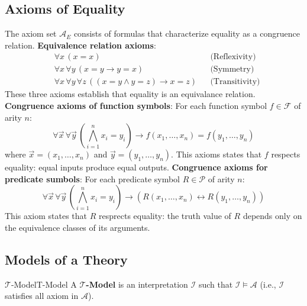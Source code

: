 \documentclass[a4paper]{article}
\theoremstyle{definition}
\begin{document}
\subsection{Axioms of Equality}
The axiom set \( \mathcal{A}_{E} \) consists of formulas that characterize equality as a congruence relation.
\vspace{1em}
\noindent
\newline
\textbf{Equivalence relation axioms}:
\begin{align*}
	& \forall x\, (x = x) && \text{(Reflexivity)} \\
	& \forall x\, \forall y\, (x = y \rightarrow y = x) && \text{(Symmetry)} \\
	& \forall x\, \forall y\, \forall z\, ((x = y \wedge y = z) \rightarrow x = z) && \text{(Transitivity)}
\end{align*}
These three axioms establish that equality is an equivalance relation.
\vspace{1em}
\noindent
\newline
\textbf{Congruence axioms of function symbols}: For each function symbol \( f \in \mathcal{F} \) of arity \( n \):
\[
	\forall \overrightarrow{x}\, \forall \overrightarrow{y}\, (\bigwedge_{i = 1}^{n} x_i = y_i) \rightarrow f(x_1, \ldots, x_n) = f(y_1, \ldots, y_n) 
\]
where \( \overrightarrow{x} = (x_1, \ldots, x_n) \) and \( \overrightarrow{y} = (y_1, \ldots, y_n) \).
\vspace{1em}
\noindent
\newline
This axioms states that \( f \) respects equality: equal inputs produce equal outputs.\vspace{1em}
\noindent
\newline
\textbf{Congruence axioms for predicate sumbols}: For each predicate symbol \( R \in \mathcal{P} \) of arity \( n \):
\[
  \forall \overrightarrow{x}\, \forall \overrightarrow{y}\, (\bigwedge_{i = 1}^{n} x_i = y_i) \rightarrow (R(x_1, \ldots, x_n) \leftrightarrow R(y_1, \ldots, y_n))
\]
This axiom states that \( R \) resprects equality: the truth value of \( R \) depends only on the equivalence classes of its arguments.
\subsection{Models of a Theory}
\begin{definition}{\( \mathcal{T} \)-Model}{T-Model}
A \( \mathcal{T} \)\textbf{-Model} is an interpretation \( \mathcal{I} \) such that \( \mathcal{I} \models \mathcal{A} \) (i.e., \( \mathcal{I} \) satisfies 
all axiom in \( \mathcal{A} \)).
\end{definition}
\end{document}
